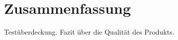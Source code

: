 \documentclass[parskip=full,11pt]{scrartcl}
\begin{document}
\begin{itemize}
\end{itemize}   

\newpage
\section{Zusammenfassung} \label{zusammenfassung}
Testüberdeckung. Fazit über die Qualität des Produkts.
\end{document}
